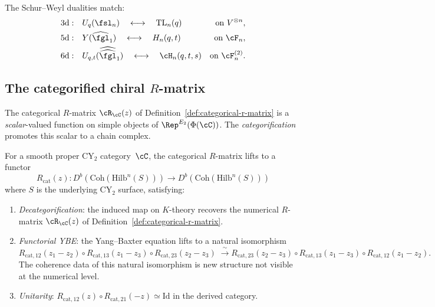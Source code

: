 The Schur--Weyl dualities match:
\begin{equation}\label{eq:schur-weyl-hierarchy}
\begin{aligned}
 3\text{d}: \quad & U_q(\fsl_n) \quad \longleftrightarrow \quad \mathrm{TL}_n(q) & \text{on } V^{\otimes n}, \\
 5\text{d}: \quad & Y(\widehat{\fgl}_1) \quad \longleftrightarrow \quad H_n(q,t) & \text{on } \cF_n, \\
 6\text{d}: \quad & U_{q,t}(\widehat{\widehat{\fgl}}_1) \quad \longleftrightarrow \quad \cH_n(q,t,s) & \text{on } \cF_n^{(2)}.
\end{aligned}
\end{equation}

\subsection{The categorified chiral \texorpdfstring{$R$}{R}-matrix}
\label{subsec:cat-r-matrix}

The categorical $R$-matrix $\cR_\cC(z)$ of Definition~\ref{def:categorical-r-matrix} is a \emph{scalar}-valued function on simple objects of $\Rep^{E_2}(\Phi(\cC))$. The \emph{categorification} promotes this scalar to a chain complex.

\begin{conjecture}
\label{conj:cat-chiral-r-matrix}
\ClaimStatusConjectured
For a smooth proper CY$_2$ category~$\cC$, the categorical $R$-matrix lifts to a functor
\[
 R_{\mathrm{cat}}(z) \colon D^b(\mathrm{Coh}(\mathrm{Hilb}^n(S)))
 \longrightarrow D^b(\mathrm{Coh}(\mathrm{Hilb}^n(S)))
\]
where $S$ is the underlying CY$_2$ surface, satisfying:
\begin{enumerate}[label=\textup{(\roman*)}]
 \item \emph{Decategorification}: the induced map on $K$-theory recovers the numerical $R$-matrix $\cR_\cC(z)$ of Definition~\textup{\ref{def:categorical-r-matrix}}.
 \item \emph{Functorial YBE}: the Yang--Baxter equation lifts to a natural isomorphism
 \[
 R_{\mathrm{cat},12}(z_1\!-\!z_2) \circ R_{\mathrm{cat},13}(z_1\!-\!z_3) \circ R_{\mathrm{cat},23}(z_2\!-\!z_3)
 \;\xrightarrow{\;\sim\;}
 R_{\mathrm{cat},23}(z_2\!-\!z_3) \circ R_{\mathrm{cat},13}(z_1\!-\!z_3) \circ R_{\mathrm{cat},12}(z_1\!-\!z_2).
 \]
 The coherence data of this natural isomorphism is new structure not visible at the numerical level.
 \item \emph{Unitarity}: $R_{\mathrm{cat},12}(z) \circ R_{\mathrm{cat},21}(-z) \simeq \mathrm{Id}$ in the derived category.
\end{enumerate}
\end{conjecture}

